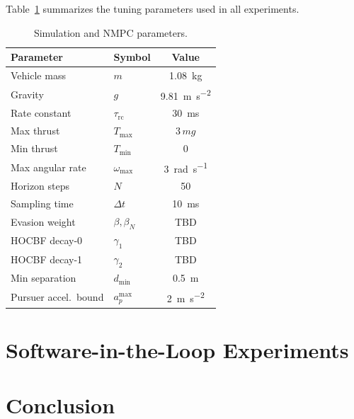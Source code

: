 \documentclass[lettersize,journal]{IEEEtran}
\theoremstyle{definition}
\theoremstyle{remark}
\begin{document}
Table~\ref{tab:params} summarizes the tuning parameters used
in all experiments.

\begin{table}[t]
\caption{Simulation and NMPC parameters.}
\label{tab:params}
\centering
\renewcommand{\arraystretch}{1.2}
\begin{tabular}{@{}llc@{}}
\toprule
\textbf{Parameter} & \textbf{Symbol} & \textbf{Value} \\
\midrule
Vehicle mass       & $m$             & \SI{1.08}{\kilo\gram} \\
Gravity            & $g$             & \SI{9.81}{\meter\per\second\squared} \\
Rate constant      & $\tau_{\mathrm{rc}}$ & \SI{30}{\milli\second} \\
Max thrust         & $T_{\max}$      & $3\,mg$ \\
Min thrust         & $T_{\min}$      & $0$ \\
Max angular rate   & $\omega_{\max}$ & \SI{3}{\radian\per\second} \\
Horizon steps      & $N$             & 50 \\
Sampling time      & $\Delta t$      & \SI{10}{\milli\second} \\
\midrule
Evasion weight     & $\beta,\beta_N$ & TBD \\
HOCBF decay-0      & $\gamma_1$      & TBD \\
HOCBF decay-1      & $\gamma_2$      & TBD \\
Min separation     & $d_{\min}$      & \SI{0.5}{\meter} \\
Pursuer accel.\ bound & $a_p^{\max}$ & \SI{2}{\meter\per\second\squared} \\
\bottomrule
\end{tabular}
\end{table}

\section{Software-in-the-Loop Experiments}
\label{sec:results}


\section{Conclusion}
\label{sec:conclusion}
\end{document}
